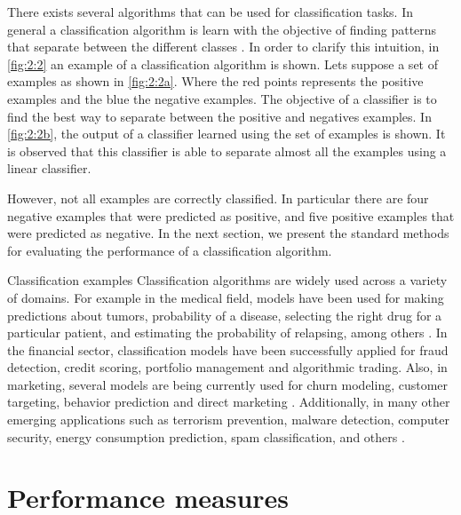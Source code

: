 There exists several algorithms that can be used for classification tasks. In general a 
classification algorithm is learn with the objective of finding patterns that separate between the 
different classes \citep{Hastie2009}. In order to clarify this intuition, in \figurename{ 
\ref{fig:2:2}} an example of a classification algorithm is shown. Lets suppose a set of examples as 
shown in \figurename{ \ref{fig:2:2a}}.  Where the red points represents the positive examples and 
the blue the negative examples. The objective of a classifier is to find the best way to separate 
between the positive and negatives examples. In \figurename{ \ref{fig:2:2b}}, the output of a 
classifier learned using the set of examples is shown. It is observed that this classifier is able 
to separate almost all the examples using a linear classifier. 

However, not all examples are correctly classified. In particular there are four negative examples 
that were predicted as positive, and five positive examples that were predicted as negative. In the 
next section, we present the standard methods for evaluating the performance of a classification 
algorithm.

\begin{remark}{Classification examples}
Classification algorithms are widely used across a variety of domains. For example in the 
medical field, models have been used for making predictions about tumors, probability 
of a disease, selecting the right drug for a particular patient, and estimating the probability of 
relapsing, among others \citep{Herland2014}. In the financial sector, classification models have 
been successfully applied for fraud detection, credit scoring, portfolio management and algorithmic 
trading. Also, in marketing, several models are being currently used for churn modeling, customer 
targeting, behavior prediction and direct marketing \citep{Baesens2014}. Additionally, in many 
other emerging applications such as terrorism prevention, malware detection, computer security, 
energy consumption prediction, spam classification, and others \citep{Kriegel2007}.
\end{remark}


\section{Performance measures}

